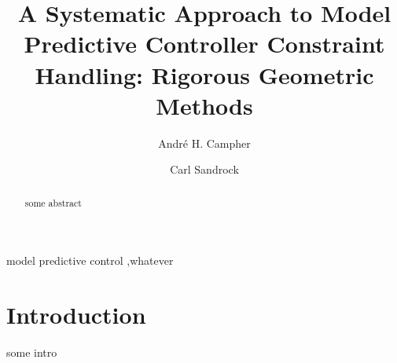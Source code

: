\documentclass[preprint,authoryear,12pt]{elsarticle}
\begin{document}
\begin{frontmatter}

\title{A Systematic Approach to Model Predictive Controller Constraint Handling: Rigorous Geometric Methods}

\author{Andr\'e H. Campher}

\author{Carl Sandrock}


\address{Department of Chemical Engineering, University of Pretoria, Pretoria 0001, South Africa}

\begin{abstract}
some abstract
\end{abstract}

\begin{keyword}
model predictive control \sep whatever
\end{keyword}

\end{frontmatter}



\section{Introduction}\label{sec:intro}
some intro
\citep{qhull}


\end{document}
